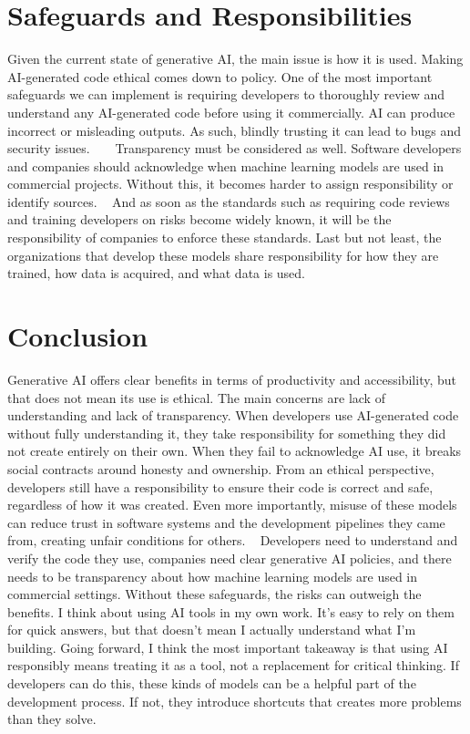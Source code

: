 \documentclass[sigconf, 12pt]{acmart}
\begin{document}
\section{Safeguards and Responsibilities}
Given the current state of generative AI, the main issue is how it is used. Making AI-generated code ethical comes down to policy. One of the most important safeguards we can implement is requiring developers to thoroughly review and understand any AI-generated code before using it commercially. AI can produce incorrect or misleading outputs. As such, blindly trusting it can lead to bugs and security issues. ~\cite{(3)} ~\cite{(5)} Transparency must be considered as well. Software developers and companies should acknowledge when machine learning models are used in commercial projects. Without this, it becomes harder to assign responsibility or identify sources. ~\cite{(8)} And as soon as the standards such as requiring code reviews and training developers on risks become widely known, it will be the responsibility of companies to enforce these standards. Last but not least, the organizations that develop these models share responsibility for how they are trained, how data is acquired, and what data is used.

\section{Conclusion}
Generative AI offers clear benefits in terms of productivity and accessibility, but that does not mean its use is ethical. The main concerns are lack of understanding and lack of transparency. When developers use AI-generated code without fully understanding it, they take responsibility for something they did not create entirely on their own. When they fail to acknowledge AI use, it breaks social contracts around honesty and ownership. From an ethical perspective, developers still have a responsibility to ensure their code is correct and safe, regardless of how it was created. Even more importantly, misuse of these models can reduce trust in software systems and the development pipelines they came from, creating unfair conditions for others. ~\cite{(8)} Developers need to understand and verify the code they use, companies need clear generative AI policies, and there needs to be transparency about how machine learning models are used in commercial settings. Without these safeguards, the risks can outweigh the benefits. I think about using AI tools in my own work. It’s easy to rely on them for quick answers, but that doesn't mean I actually understand what I’m building. Going forward, I think the most important takeaway is that using AI responsibly means treating it as a tool, not a replacement for critical thinking. If developers can do this, these kinds of models can be a helpful part of the development process. If not, they introduce shortcuts that creates more problems than they solve.
\end{document}
